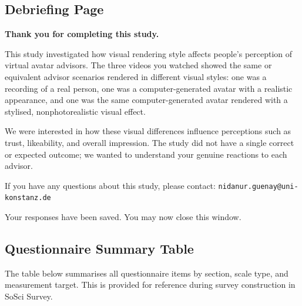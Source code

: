 \documentclass[11pt, a4paper]{article}
\begin{document}
\newpage

\subsection{Debriefing Page}

\begin{infobox}
\small
\textbf{Thank you for completing this study.}

\vspace{6pt}
This study investigated how visual rendering style affects people's perception of virtual avatar advisors. The three videos you watched showed the same or equivalent advisor scenarios rendered in different visual styles: one was a recording of a real person, one was a computer-generated avatar with a realistic appearance, and one was the same computer-generated avatar rendered with a stylised, nonphotorealistic visual effect.

\vspace{6pt}
We were interested in how these visual differences influence perceptions such as trust, likeability, and overall impression. The study did not have a single correct or expected outcome; we wanted to understand your genuine reactions to each advisor.

\vspace{6pt}
If you have any questions about this study, please contact: \texttt{nidanur.guenay@uni-konstanz.de}

\vspace{6pt}
Your responses have been saved. You may now close this window.
\end{infobox}

\newpage

\subsection{Questionnaire Summary Table}

The table below summarises all questionnaire items by section, scale type, and measurement target. This is provided for reference during survey construction in SoSci Survey.
\end{document}
